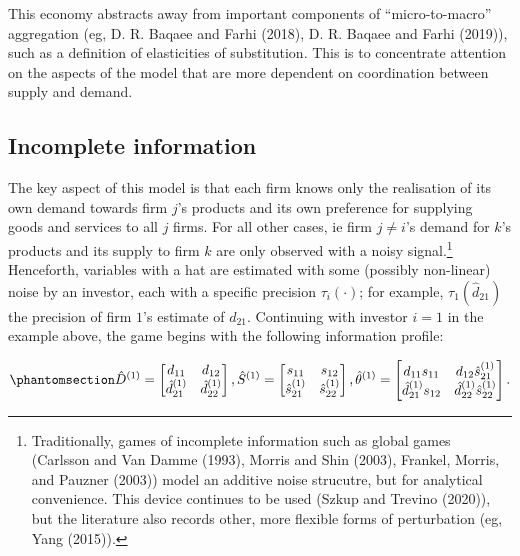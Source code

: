 \documentclass[
]{article}
\theoremstyle{definition}
\theoremstyle{plain}
\theoremstyle{remark}
\begin{document}
This economy abstracts away from important components of
``micro-to-macro'' aggregation (eg, D. R. Baqaee and Farhi (2018), D. R.
Baqaee and Farhi (2019)), such as a definition of elasticities of
substitution. This is to concentrate attention on the aspects of the
model that are more dependent on coordination between supply and demand.

\subsection{Incomplete information}\label{incomplete-information}

The key aspect of this model is that each firm knows only the
realisation of its own demand towards firm \(j\)'s products and its own
preference for supplying goods and services to all \(j\) firms. For all
other cases, ie firm \(j \neq i\)'s demand for \(k\)'s products and its
supply to firm \(k\) are only observed with a noisy signal.\footnote{Traditionally,
  games of incomplete information such as global games (Carlsson and Van
  Damme (1993), Morris and Shin (2003), Frankel, Morris, and Pauzner
  (2003)) model an additive noise strucutre, but for analytical
  convenience. This device continues to be used (Szkup and Trevino
  (2020)), but the literature also records other, more flexible forms of
  perturbation (eg, Yang (2015)).} Henceforth, variables with a hat are
estimated with some (possibly non-linear) noise by an investor, each
with a specific precision \(\tau_i(\cdot)\); for example,
\(\tau_1(\hat{d}_{21})\) the precision of firm \(1\)'s estimate of
\(d_{21}\). Continuing with investor \(i=1\) in the example above, the
game begins with the following information profile:

\begin{equation}\phantomsection\label{eq-DStheta}{
\hat{D}^{(1)} = 
\begin{bmatrix}
d_{11} & d_{12} \\
\hat{d}_{21}^{(1)} & \hat{d}_{22}^{(1)}
\end{bmatrix}
,
\hat{S}^{(1)} = 
\begin{bmatrix}
s_{11} & s_{12} \\
\hat{s}_{21}^{(1)} & \hat{s}_{22}^{(1)}
\end{bmatrix}
,
\hat{\theta}^{(1)} = 
\begin{bmatrix}
d_{11}s_{11} & d_{12}\hat{s}_{21}^{(1)} \\
\hat{d}_{21}^{(1)} s_{12} & \hat{d}_{22}^{(1)} \hat{s}_{22}^{(1)}
\end{bmatrix}.
}\end{equation}
\end{document}

